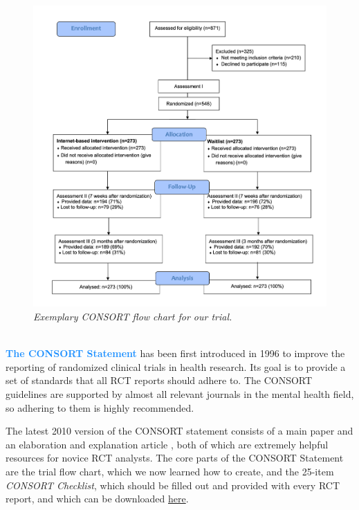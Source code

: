 \begin{figure}[H]
\includegraphics[width=13cm]{images/consort.png}
\captionsetup{labelformat=empty} 
\caption{\emph{Exemplary CONSORT flow chart for our trial.}}
\centering
\end{figure}


\begin{box-info} \\
\textcolor{dodgerblue}{\textbf{The CONSORT Statement}} has been first introduced in 1996 to improve the reporting of randomized clinical trials in health research. Its goal is to provide a set of standards that all RCT reports should adhere to. The CONSORT guidelines are supported by almost all relevant journals in the mental health field, so adhering to them is highly recommended. 

\vspace{2mm}

\hspace*{5mm} The latest 2010 version of the CONSORT statement consists of a main paper \citep{schulz2010consort} and an elaboration and explanation article \citep{moher2012consort}, both of which are extremely helpful resources for novice RCT analysts. The core parts of the CONSORT Statement are the trial flow chart, which we now learned how to create, and the 25-item \emph{CONSORT Checklist}, which should be filled out and provided with every RCT report, and which can be downloaded \href{https://www.consort-statement.org/download/Media/Default/Downloads/CONSORT%202010%20Checklist.doc}{here}.
\end{box-info}


